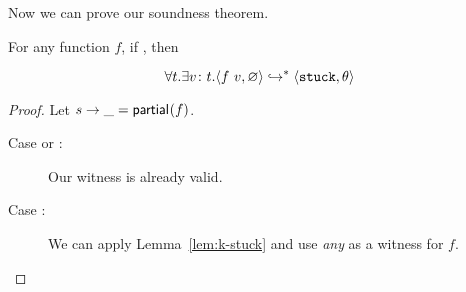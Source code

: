 Now we can prove our soundness theorem.

\begin{thm}
\label{thm:soundness}
  For any function $f$, if ,
  then

$$
  \forall t. \exists {v} \colon {t}. \langle f \ v, \varnothing \rangle \hookrightarrow^{*} \langle \mathtt{stuck}, \theta \rangle
$$
\end{thm}
\begin{proof}
  Let ${s} \rightarrow \_ = \mathsf{partial}_{}(f)$.
  \begin{description}
  \item[Case  or :] Our witness is already valid.
  \item[Case :] We can apply Lemma~\ref{lem:k-stuck} and
    use \emph{any}  as a witness for $f$.
  \end{description}
\end{proof}



